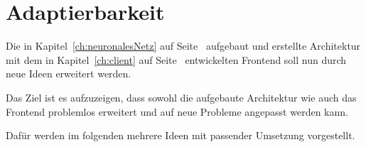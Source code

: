 \chapter{Adaptierbarkeit}
\label{ch:adaptierbarkeit}
Die in Kapitel~\ref{ch:neuronalesNetz} auf Seite~\pageref{ch:neuronalesNetz} aufgebaut und erstellte Architektur mit
dem in Kapitel~\ref{ch:client} auf Seite~\pageref{ch:client} entwickelten Frontend soll nun durch neue Ideen erweitert
werden.

Das Ziel ist es aufzuzeigen, dass sowohl die aufgebaute Architektur wie auch das Frontend problemlos erweitert und auf
neue Probleme angepasst werden kann.

Dafür werden im folgenden mehrere Ideen mit passender Umsetzung vorgestellt.